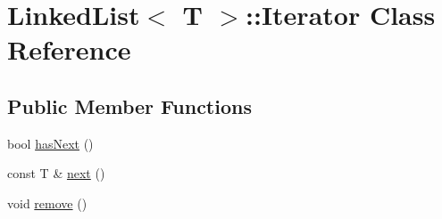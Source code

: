 \hypertarget{class_linked_list_1_1_iterator}{\section{Linked\-List$<$ T $>$\-:\-:Iterator Class Reference}
\label{class_linked_list_1_1_iterator}
}
\subsection*{Public Member Functions}
\begin{DoxyCompactItemize}
\item 
bool \hyperlink{class_linked_list_1_1_iterator_a1ce93392129927a71250c6ca367cf1bd}{has\-Next} ()
\item 
const T \& \hyperlink{class_linked_list_1_1_iterator_a6a83cec3fa39c286c951daf5aa12e56d}{next} ()
\item 
void \hyperlink{class_linked_list_1_1_iterator_a36832ccc5473db2ffee78e58447130b8}{remove} ()
\end{DoxyCompactItemize}


